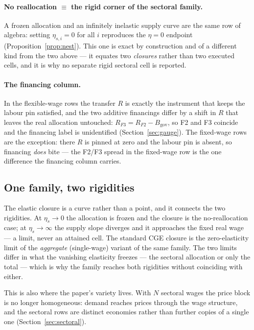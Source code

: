 \paragraph{No reallocation $\equiv$ the rigid corner of the sectoral
family.} A frozen allocation and an infinitely inelastic supply curve are
the same row of algebra: setting $\eta_{s,i}=0$ for all $i$ reproduces the
$\eta=0$ endpoint (Proposition~\ref{prop:nest}). This one is exact by
construction and of a different kind from the two above --- it equates two
\emph{closures} rather than two executed cells, and it is why no separate
rigid sectoral cell is reported.

\paragraph{The financing column.} In the flexible-wage rows the transfer
$R$ is exactly the instrument that keeps the labour pin satisfied, and the
two additive financings differ by a shift in $R$ that leaves the real
allocation untouched: $R_{F3}=R_{F2}-B_{\mathrm{gov}}$, so F2 and F3
coincide and the financing label is unidentified
(Section~\ref{sec:gauge}). The fixed-wage rows are the exception: there $R$
is pinned at zero and the labour pin is absent, so financing \emph{does}
bite --- the F2/F3 spread in the fixed-wage row is the one difference the
financing column carries.

\subsection{One family, two rigidities}\label{app:eqfamily}

The elastic closure is a curve rather than a point, and it connects the two
rigidities. At $\eta_s\to0$ the allocation is frozen and the closure is the
no-reallocation case; at $\eta_s\to\infty$ the supply slope diverges and it
approaches the fixed real wage --- a limit, never an attained cell. The
standard CGE closure is the zero-elasticity limit of the \emph{aggregate}
(single-wage) variant of the same family. The two limits differ in what the
vanishing elasticity freezes --- the sectoral allocation or only the total
--- which is why the family reaches both rigidities without coinciding with
either.

This is also where the paper's variety lives. With $N$ sectoral wages the
price block is no longer homogeneous: demand reaches prices through the
wage structure, and the sectoral rows are distinct economies rather than
further copies of a single one (Section~\ref{sec:sectoral}).


